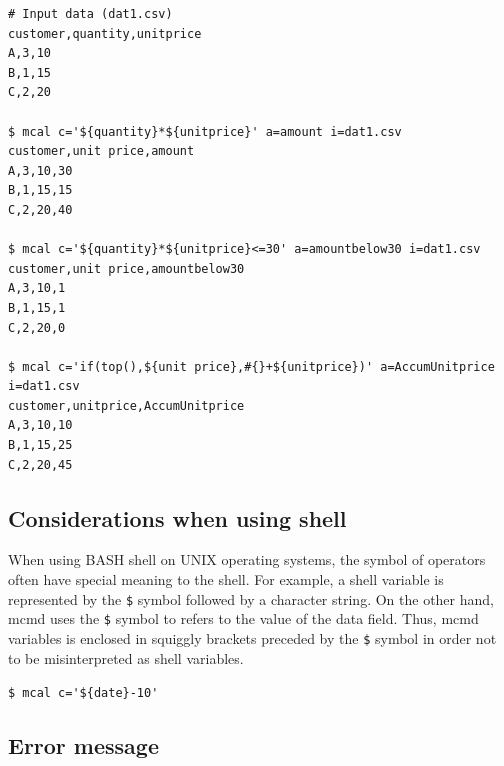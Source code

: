 \begin{Verbatim}[baselinestretch=0.7,frame=single,fontsize=\small]
# Input data (dat1.csv)
customer,quantity,unitprice
A,3,10
B,1,15
C,2,20

$ mcal c='${quantity}*${unitprice}' a=amount i=dat1.csv
customer,unit price,amount
A,3,10,30
B,1,15,15
C,2,20,40

$ mcal c='${quantity}*${unitprice}<=30' a=amountbelow30 i=dat1.csv
customer,unit price,amountbelow30
A,3,10,1
B,1,15,1
C,2,20,0

$ mcal c='if(top(),${unit price},#{}+${unitprice})' a=AccumUnitprice i=dat1.csv
customer,unitprice,AccumUnitprice
A,3,10,10
B,1,15,25
C,2,20,45
\end{Verbatim}



\subsection*{Considerations when using shell }

When using BASH shell on UNIX operating systems, the symbol of operators often have special meaning to the shell. For example, a shell variable is represented by the \verb|$| symbol followed by a character string. On the other hand, mcmd uses the \verb|$| symbol to refers to the value of the data field. Thus, mcmd variables is enclosed in squiggly brackets preceded by the \verb|$| symbol in order not to be misinterpreted as shell variables. 

\verb|$ mcal c='${date}-10'|

\subsection*{Error message}

